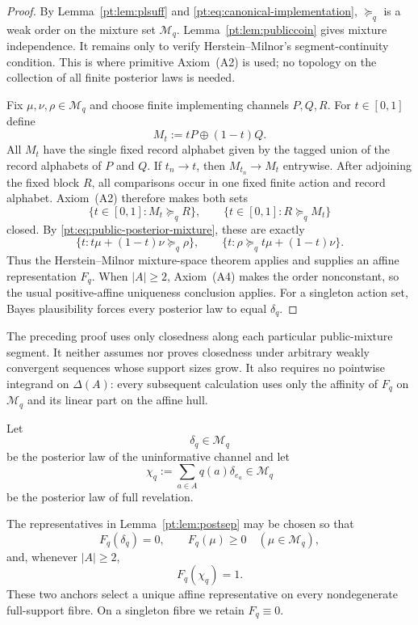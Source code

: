 \begin{proof}
By Lemma~\ref{pt:lem:plsuff} and
\eqref{pt:eq:canonical-implementation}, $\succeq_q$ is a weak order on the
mixture set $\mathcal M_q$.  Lemma~\ref{pt:lem:publiccoin} gives mixture
independence.  It remains only to verify Herstein--Milnor's segment-continuity
condition.  This is where primitive
Axiom~\textup{(A2)} is used; no topology on the collection of all finite
posterior laws is needed.

Fix $\mu,\nu,\rho\in\mathcal M_q$ and choose finite implementing channels
$P,Q,R$.  For $t\in[0,1]$ define
\[
 M_t:=tP\oplus(1-t)Q.
\]
All $M_t$ have the single fixed record alphabet given by the tagged union of
the record alphabets of $P$ and $Q$.  If $t_n\to t$, then $M_{t_n}\to M_t$
entrywise.  After adjoining the fixed block $R$, all comparisons occur in one
fixed finite action and record alphabet.  Axiom~\textup{(A2)} therefore makes
both sets
\[
 \{t\in[0,1]:M_t\succeq_q R\},
 \qquad
 \{t\in[0,1]:R\succeq_q M_t\}
\]
closed.  By \eqref{pt:eq:public-posterior-mixture}, these are exactly
\[
 \{t:t\mu+(1-t)\nu\succeq_q\rho\},
 \qquad
 \{t:\rho\succeq_qt\mu+(1-t)\nu\}.
\]
Thus the Herstein--Milnor mixture-space theorem
\cite{HersteinMilnor1953} applies and supplies an affine representation
$F_q$.  When $|A|\ge2$, Axiom~\textup{(A4)} makes the order nonconstant, so
the usual positive-affine uniqueness conclusion applies.  For a singleton
action set, Bayes plausibility forces every posterior law to equal
$\delta_q$.
\end{proof}

The preceding proof uses only closedness along each particular public-mixture
segment.  It neither assumes nor proves closedness under arbitrary weakly
convergent sequences whose support sizes grow.  It also requires no
pointwise integrand on $\Delta(A)$: every subsequent calculation uses only the
affinity of $F_q$ on $\mathcal M_q$ and its linear part on the affine hull.

Let
\[
 \delta_q\in\mathcal M_q
\]
be the posterior law of the uninformative channel and let
\[
 \chi_q:=\sum_{a\in A}q(a)\delta_{e_a}\in\mathcal M_q
\]
be the posterior law of full revelation.

\begin{lemma}\label{pt:lem:convnorm}
The representatives in Lemma~\ref{pt:lem:postsep} may be chosen so that
\begin{equation}
 F_q(\delta_q)=0,
 \qquad
 F_q(\mu)\ge0\quad(\mu\in\mathcal M_q),
 \label{pt:eq:zero-minimum}
\end{equation}
and, whenever $|A|\ge2$,
\begin{equation}
 F_q(\chi_q)=1.
 \label{pt:eq:full-revelation-anchor}
\end{equation}
These two anchors select a unique affine representative on every
nondegenerate full-support fibre.  On a singleton fibre we retain
$F_q\equiv0$.
\end{lemma}

